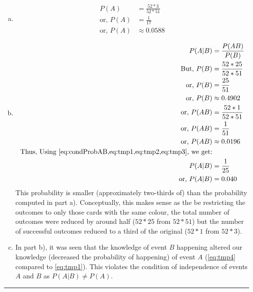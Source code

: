 \begin{enumerate}[a.]
	\item
	\begin{align}
		P(A) &= \frac{52*3}{52*51} \nonumber\\
		\text{or, } P(A) &= \frac{1}{17} \nonumber\\
		\text{or, } P(A) &\approx 0.0588 \label{eq:tmp1}
	\end{align}
	\item
	\begin{align}
		P(A|B) &= \frac{P(AB)}{P(B)} \label{eq:condProbAB}\\
		\text{But, } P(B) &= \frac{52*25}{52*51} \nonumber\\
		\text{or, } P(B) &= \frac{25}{51} \nonumber\\
		\text{or, } P(B) &\approx 0.4902 \label{eq:tmp2}\\
		\text{or, } P(AB) &= \frac{52*1}{52*51} \nonumber\\
		\text{or, } P(AB) &= \frac{1}{51} \nonumber \\
		\text{or, } P(AB) &\approx 0.0196 \label{eq:tmp3}\\
		\text{Thus, Using \cref{eq:condProbAB,eq:tmp1,eq:tmp2,eq:tmp3}, we get:} & {} \nonumber\\
		\text{} P(A|B) &= \frac{1}{25} \nonumber\\
		\text{or, } P(A|B) &= 0.040 \label{eq:tmp4}
	\end{align}
	This probability is smaller (approximately two-thirds of) than the probability computed in part a). Conceptually, this makes sense as the be restricting the outcomes to only those cards with the same colour, the total number of outcomes were reduced by around half ($52*25$ from $52*51$) but the number of successful outcomes reduced to a third of the original ($52*1$ from $52*3$). 

	\item In part b), it was seen that the knowledge of event $B$ happening altered our knowledge (decreased the probability of happening) of event $A$ (\cref{eq:tmp4} compared to \cref{eq:tmp1}). This violates the condition of independence of events $A$ and $B$ as $P(A|B) \neq P(A)$. 
\end{enumerate}

\noindent\rule{\textwidth}{1pt}
\newpage